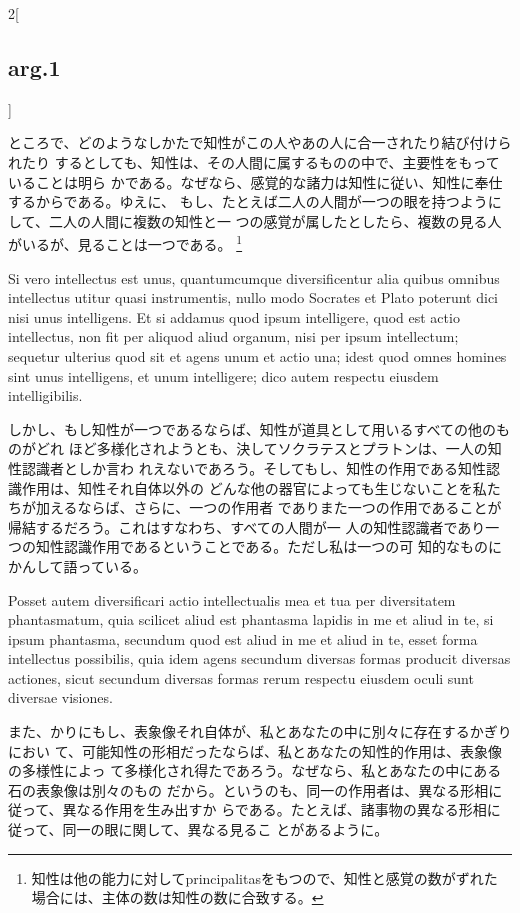 \documentclass[paper=a4paper,fontsize=10pt,jafontsize=9pt,titlepage]{jlreq}
\begin{document}
\begin{paracol}{2}[\subsection{arg.1}]
\switchcolumn

 ところで、どのようなしかたで知性がこの人やあの人に合一されたり結び付けられたり
 するとしても、知性は、その人間に属するものの中で、主要性をもっていることは明ら
 かである。なぜなら、感覚的な諸力は知性に従い、知性に奉仕するからである。ゆえに、
 もし、たとえば二人の人間が一つの眼を持つようにして、二人の人間に複数の知性と一
 つの感覚が属したとしたら、複数の見る人がいるが、見ることは一つである。
 \footnote{知性は他の能力に対してprincipalitasをもつので、知性と感覚の数がずれた
 場合には、主体の数は知性の数に合致する。}

 \switchcolumn

 Si vero intellectus est unus, quantumcumque diversificentur alia quibus omnibus
 intellectus utitur quasi instrumentis, nullo modo Socrates et Plato poterunt
 dici nisi unus intelligens. Et si addamus quod ipsum intelligere, quod est
 actio intellectus, non fit per aliquod aliud organum, nisi per ipsum
 intellectum; sequetur ulterius quod sit et agens unum et actio una; idest quod
 omnes homines sint unus intelligens, et unum intelligere; dico autem respectu
 eiusdem intelligibilis.

\switchcolumn

しかし、もし知性が一つであるならば、知性が道具として用いるすべての他のものがどれ
ほど多様化されようとも、決してソクラテスとプラトンは、一人の知性認識者としか言わ
れえないであろう。そしてもし、知性の作用である知性認識作用は、知性それ自体以外の
どんな他の器官によっても生じないことを私たちが加えるならば、さらに、一つの作用者
でありまた一つの作用であることが帰結するだろう。これはすなわち、すべての人間が一
人の知性認識者であり一つの知性認識作用であるということである。ただし私は一つの可
知的なものにかんして語っている。
 
\switchcolumn*

 Posset autem diversificari actio intellectualis mea et tua per diversitatem
 phantasmatum, quia scilicet aliud est phantasma lapidis in me et aliud in te,
 si ipsum phantasma, secundum quod est aliud in me et aliud in te, esset forma
 intellectus possibilis, quia idem agens secundum diversas formas producit
 diversas actiones, sicut secundum diversas formas rerum respectu eiusdem oculi
 sunt diversae visiones.

 \switchcolumn

 また、かりにもし、表象像それ自体が、私とあなたの中に別々に存在するかぎりにおい
 て、可能知性の形相だったならば、私とあなたの知性的作用は、表象像の多様性によっ
 て多様化され得たであろう。なぜなら、私とあなたの中にある石の表象像は別々のもの
 だから。というのも、同一の作用者は、異なる形相に従って、異なる作用を生み出すか
 らである。たとえば、諸事物の異なる形相に従って、同一の眼に関して、異なる見るこ
 とがあるように。


\end{paracol}
\end{document}
